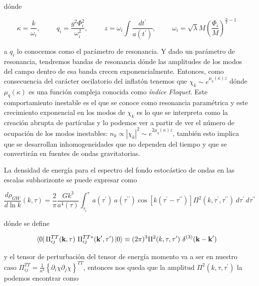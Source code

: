 \noindent
dónde 

\begin{equation}
    \kappa = \frac{k}{\omega_i}, \hspace{1cm} q_i = \frac{g^2 \Phi_i^2}{\omega^2_i}, \hspace{1cm} z = \omega_i \int \frac{dt^\prime}{a(t^\prime)}, \hspace{1cm} \omega_i = \sqrt{\lambda} M \left( \frac{\Phi_i}{M} \right)^{\displaystyle \frac{n}{2} - 1}
\end{equation}

\noindent
a $q_i$ lo conocemos como el parámetro de resonancia. Y dado un parámetro de resonancia, tendremos bandas de resonancia dónde las amplitudes de los modos del campo dentro de esa banda crecen exponencialmente. Entonces, como consecuencia del carácter oscilatorio del inflatón tenemos que $\chi_k \sim e^{\mu_q (\kappa) z}$ dónde $\mu_q (\kappa)$ es una función compleja conocida como \textit{índice Floquet}. Este comportamiento inestable es el que se conoce como resonancia paramétrica y este crecimiento exponencial en los modos de $\chi_k$ es lo que se interpreta como la creación abrupta de partículas y lo podemos ver a partir de ver el número de ocupación de los modos inestables: $\displaystyle n_k \propto |\chi_k|^2 \sim e^{2 \mu_q (\kappa) z}$, también esto implica que se desarrollan inhomogeneidades que no dependen del tiempo y que se convertirán en fuentes de ondas gravitatorias.

La densidad de energía para el espectro del fondo estocástico de ondas en las escalas subhorizonte se puede expresar como

\begin{equation}
    \frac{d \rho_{GW}}{d \ln k} (k, \tau) = \frac{2}{\pi} \frac{G k^3}{a^4 (\tau)} \int_{\tau_i}^\tau a(\tau^\prime) \ a(\tau^{\prime\prime}) \cos \left[ k \left( \tau^\prime - \tau^{\prime\prime} \right) \right] \Pi^2 \left( k, \tau^\prime, \tau^{\prime\prime} \right) \ d\tau^\prime \ d\tau^{\prime\prime}
\end{equation}

\noindent
dónde se define

\begin{equation}
    \bra{0} \Pi_{ij}^{TT} (\textbf{k}, \tau) \ \Pi_{ij}^{TT*} (\textbf{k}^\prime, \tau^\prime) \ket{0} \equiv (2 \pi)^3 \Pi^2 (k, \tau, \tau^\prime) \ \delta^{(3)} (\textbf{k} - \textbf{k}^\prime)
\end{equation}

\noindent
y el tensor de perturbación del tensor de energía momento va a ser en nuestro caso $\displaystyle \Pi_{ij}^{TT} = \frac{1}{a^2} \left\{ \partial_i \chi \partial_j \chi \right\}^{TT}$, entonces nos queda que la amplitud $\Pi^2 (k, \tau, \tau^\prime)$ la podemos encontrar como


